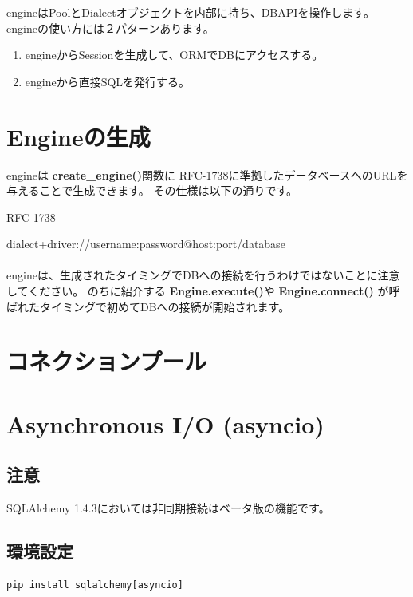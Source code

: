 engineはPoolとDialectオブジェクトを内部に持ち、DBAPIを操作します。
engineの使い方には２パターンあります。
\begin{enumerate}
  \item {engineからSessionを生成して、ORMでDBにアクセスする。}
  \item {engineから直接SQLを発行する。}
\end{enumerate}


\section{Engineの生成}
engineは \textbf{create\_engine()}関数に RFC-1738に準拠したデータベースへのURLを与えることで生成できます。
その仕様は以下の通りです。

\begin{dfn}
  RFC-1738
\end{dfn}

dialect+driver://username:password@host:port/database
\\
\\
engineは、生成されたタイミングでDBへの接続を行うわけではないことに注意してください。
のちに紹介する \textbf{Engine.execute()}や\textbf{ Engine.connect() }が呼ばれたタイミングで初めてDBへの接続が開始されます。


\section {コネクションプール}



\section {Asynchronous I/O (asyncio)}
\subsection*{注意}
SQLAlchemy 1.4.3においては非同期接続はベータ版の機能です。
\subsection {環境設定}
\begin{lstlisting}[caption=asyncioのインストール]
  pip install sqlalchemy[asyncio]
\end{lstlisting}
